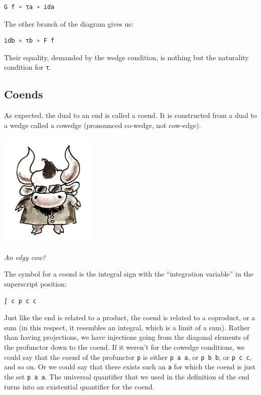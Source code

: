 \begin{verbatim}
G f ∘ τa ∘ ida
\end{verbatim}

The other branch of the diagram gives us:

\begin{verbatim}
idb ∘ τb ∘ F f
\end{verbatim}

Their equality, demanded by the wedge condition, is nothing but the
naturality condition for \texttt{τ}.

\subsection{Coends}\label{coends}

As expected, the dual to an end is called a coend. It is constructed
from a dual to a wedge called a cowedge (pronounced co-wedge, not
cow-edge).

\hypertarget{attachment_8533}{}
\includegraphics[width=1.82292in]{images/end-31.jpg}

\emph{An edgy cow?}

The symbol for a coend is the integral sign with the ``integration
variable'' in the superscript position:

\begin{verbatim}
∫ c p c c
\end{verbatim}

Just like the end is related to a product, the coend is related to a
coproduct, or a sum (in this respect, it resembles an integral, which is
a limit of a sum). Rather than having projections, we have injections
going from the diagonal elements of the profunctor down to the coend. If
it weren't for the cowedge conditions, we could say that the coend of
the profunctor \texttt{p} is either \texttt{p\ a\ a}, or
\texttt{p\ b\ b}, or \texttt{p\ c\ c}, and so on. Or we could say that
there exists such an \texttt{a} for which the coend is just the set
\texttt{p\ a\ a}. The universal quantifier that we used in the
definition of the end turns into an existential quantifier for the
coend.

